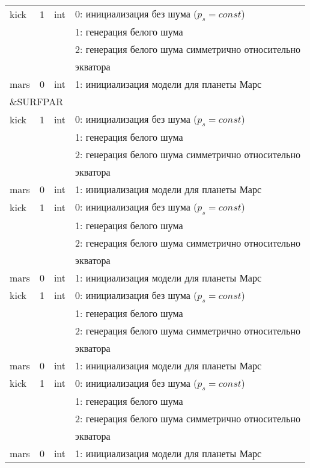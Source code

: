 \begin{longtable}[c]{|l|c|l|l|}
    kick & 1 & int & 0: инициализация без шума (\(p_s = const\)) \\
          &   &     & 1: генерация белого шума                  \\
          &   &     & 2: генерация белого шума симметрично относительно \\
      & & & экватора    \\
     mars & 0 & int & 1: инициализация модели для планеты Марс     \\
     \hline
     \multicolumn{4}{|l|}{\&SURFPAR}        \\ \hline
    kick & 1 & int & 0: инициализация без шума (\(p_s = const\)) \\
          &   &     & 1: генерация белого шума                  \\
          &   &     & 2: генерация белого шума симметрично относительно \\
      & & & экватора    \\
     mars & 0 & int & 1: инициализация модели для планеты Марс     \\
    kick & 1 & int & 0: инициализация без шума (\(p_s = const\)) \\
          &   &     & 1: генерация белого шума                  \\
          &   &     & 2: генерация белого шума симметрично относительно \\
      & & & экватора    \\
     mars & 0 & int & 1: инициализация модели для планеты Марс     \\
    kick & 1 & int & 0: инициализация без шума (\(p_s = const\)) \\
          &   &     & 1: генерация белого шума                  \\
          &   &     & 2: генерация белого шума симметрично относительно \\
      & & & экватора    \\
     mars & 0 & int & 1: инициализация модели для планеты Марс     \\
    kick & 1 & int & 0: инициализация без шума (\(p_s = const\)) \\
          &   &     & 1: генерация белого шума                  \\
          &   &     & 2: генерация белого шума симметрично относительно \\
      & & & экватора    \\
     mars & 0 & int & 1: инициализация модели для планеты Марс     \\

\end{longtable}
